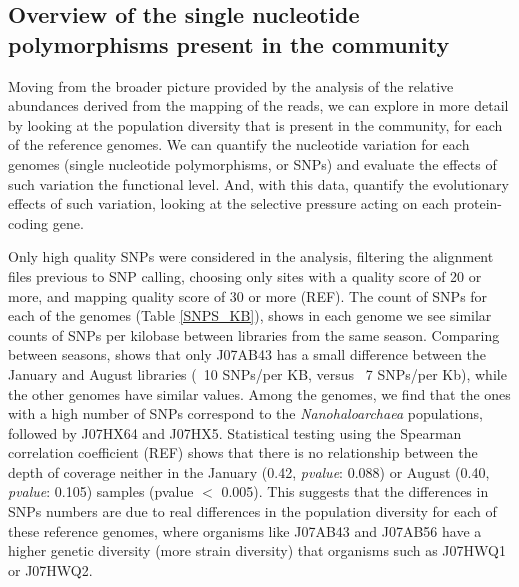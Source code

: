 \clearpage
\subsection{Overview of the single nucleotide polymorphisms present in the community}

Moving from the broader picture provided by the analysis of the relative abundances derived from the mapping of the reads, we can explore in more detail by looking at the population diversity that is present in the community, for each of the reference genomes. We can quantify the nucleotide variation for each genomes (single nucleotide polymorphisms, or SNPs) and evaluate the effects of such variation the functional level. And, with this data, quantify the evolutionary effects of such variation, looking at the selective pressure acting on each protein-coding gene.

Only high quality SNPs were considered in the analysis, filtering the alignment files previous to SNP calling, choosing only sites with a quality score of 20 or more, and mapping quality score of 30 or more (REF). The count of SNPs for each of the genomes (Table \ref{SNPS_KB}), shows in each genome we see similar counts of SNPs per kilobase between libraries from the same season. Comparing between seasons, shows that only J07AB43 has a small difference between the January and August libraries (~10 SNPs/per KB, versus ~7 SNPs/per Kb), while the other genomes have similar values. Among the genomes, we find that the ones with a high number of SNPs correspond to the \textit{Nanohaloarchaea} populations, followed by J07HX64 and J07HX5. Statistical testing using the Spearman correlation coefficient (REF) shows that there is no relationship between the depth of coverage neither in the January (0.42, \textit{pvalue}: 0.088) or August (0.40, \textit{pvalue}: 0.105) samples (pvalue $<$ 0.005). This suggests that the differences in SNPs numbers are due to real differences in the population diversity for each of these reference genomes, where organisms like J07AB43 and J07AB56 have a higher genetic diversity (more strain diversity) that organisms such as J07HWQ1 or J07HWQ2.

